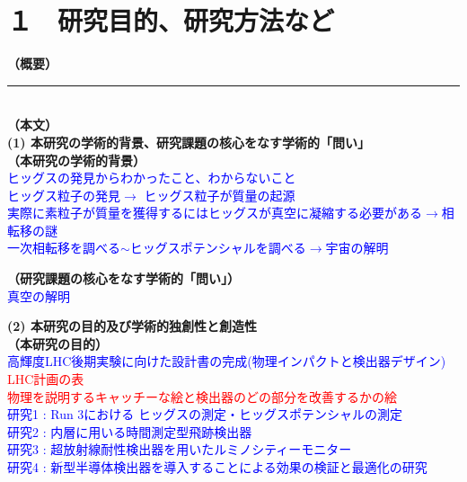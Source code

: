 \documentclass[11pt,a4j,dvipdfmx]{jarticle} 					%
\newcommand{\研究課題名}{新型半導体検出器を用いた真空の解明}
\newcommand{\研究機関名}{高エネルギー加速器研究機構}
\newcommand{\研究代表者氏名}{中村浩二}
\newcommand{\研究期間の最終元号年度}{10}  %
\newcommand{\TODO}[1]{\textcolor{red}{#1}}
\newcommand{\MEMO}[1]{\textcolor{blue}{#1}}
\begin{document}

\section{１　研究目的、研究方法など}

\noindent
\textbf{（概要）}\\


	\vspace*{10zw}	%

\noindent
\rule{\linewidth}{1pt}\\
\noindent
\textbf{（本文）}\\
\noindent\colorbox[gray]{0.9}{\textbf{(1) 本研究の学術的背景、研究課題の核心をなす学術的「問い」}}\\
\noindent\textbf{（本研究の学術的背景）}\\
\MEMO{
ヒッグスの発見からわかったこと、わからないこと\\
ヒッグス粒子の発見$\to$ ヒッグス粒子が質量の起源\\
実際に素粒子が質量を獲得するにはヒッグスが真空に凝縮する必要がある$\to$相転移の謎\\
一次相転移を調べる$\sim$ヒッグスポテンシャルを調べる$\to$宇宙の解明\\
}


\noindent\textbf{（研究課題の核心をなす学術的「問い」）}\\
\MEMO{真空の解明}

\noindent\colorbox[gray]{0.9}{\textbf{(2) 本研究の目的及び学術的独創性と創造性}}\\
\noindent\textbf{（本研究の目的）}\\
\MEMO{
高輝度LHC後期実験に向けた設計書の完成(物理インパクトと検出器デザイン)\\
\TODO{LHC計画の表}\\
\TODO{物理を説明するキャッチーな絵と検出器のどの部分を改善するかの絵}\\
研究1 : Run 3における ヒッグスの測定・ヒッグスポテンシャルの測定\\
研究2 : 内層に用いる時間測定型飛跡検出器\\
研究3 : 超放射線耐性検出器を用いたルミノシティーモニター\\
研究4 : 新型半導体検出器を導入することによる効果の検証と最適化の研究\\
}
\end{document}
